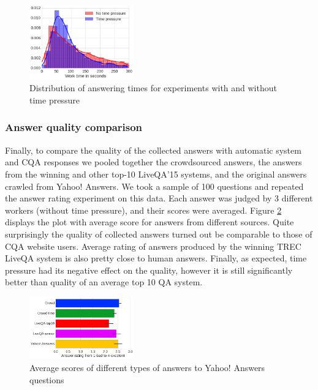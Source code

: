 \begin{figure}[t!]
	\centering
	\includegraphics[width=0.4\textwidth]{img/answering_time_distribution}
	\caption{Distribution of answering times for experiments with and without time pressure}
	\label{fig:answering_time_distribution}
\end{figure}

\subsubsection{Answer quality comparison}
\label{section:crowdsourcing:approach:experiments:comparison}

Finally, to compare the quality of the collected answers with automatic system and CQA responses we pooled together the crowdsourced answers, the answers from the winning and other top-10 LiveQA'15 systems, and the original answers crawled from Yahoo! Answers.
We took a sample of 100 questions and repeated the answer rating experiment on this data.
Each answer was judged by 3 different workers (without time pressure), and their scores were averaged.
Figure \ref{figure:crowdsourcing:average_score} displays the plot with average score for answers from different sources.
Quite surprisingly the quality of collected answers turned out be comparable to those of CQA website users.
Average rating of answers produced by the winning TREC LiveQA system is also pretty close to human answers.
Finally, as expected, time pressure had its negative effect on the quality, however it is still significantly better than quality of an average top 10 QA system.

\begin{figure}[h]
	\centering
	\includegraphics[width=0.4\textwidth]{img/average_score}
	\caption{Average scores of different types of answers to Yahoo! Answers questions}
	\label{figure:crowdsourcing:average_score}
\end{figure}

